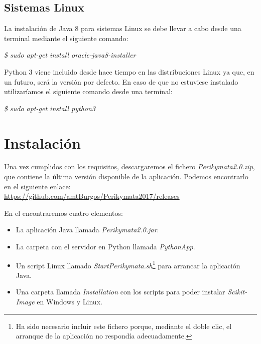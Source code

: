 

\subsection{Sistemas Linux}
La instalación de Java 8 para sistemas Linux se debe llevar a cabo desde una terminal mediante el siguiente comando:\\
\centerline{\textit{\$ sudo apt-get install oracle-java8-installer}}

Python 3 viene incluido desde hace tiempo en las distribuciones Linux ya que, en un futuro, será la versión por defecto. En caso de que no estuviese instalado utilizaríamos el siguiente comando desde una terminal: \\
\centerline{\textit{\$ sudo apt-get install python3}}

\newpage
\section{Instalación}
Una vez cumplidos con los requisitos, descargaremos el fichero \textit{Perikymata2.0.zip}, que contiene la última versión disponible de la aplicación. Podemos encontrarlo en el siguiente enlace: \\\url{https://github.com/amtBurgos/Perikymata2017/releases} 

En el encontraremos cuatro elementos:
\begin{itemize}
    \item La aplicación Java llamada \textit{Perikymata2.0.jar}.
    \item La carpeta con el servidor en Python llamada \textit{PythonApp}.
    \item Un script Linux llamado \textit{StartPerikymata.sh}\footnote{Ha sido necesario incluir este fichero porque, mediante el doble clic, el arranque de la aplicación no respondía adecuadamente.} para arrancar la aplicación Java.
    \item Una carpeta llamada \textit{Installation} con los scripts para poder instalar \textit{Scikit-Image} en Windows y Linux.
\end{itemize}

